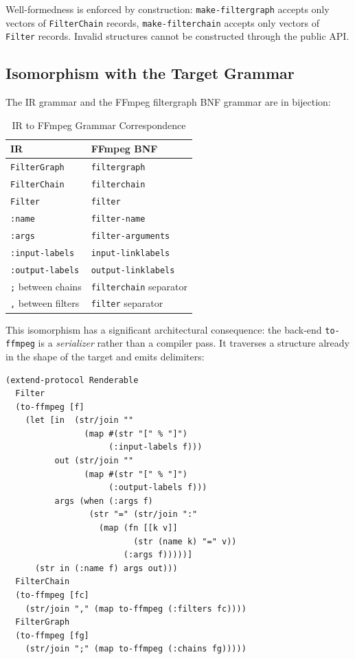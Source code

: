 \documentclass[english,submission]{programming}
\begin{document}
Well-formedness is enforced by construction: \texttt{make-filtergraph} accepts only vectors of \texttt{FilterChain} records, \texttt{make-filterchain} accepts only vectors of \texttt{Filter} records. Invalid structures cannot be constructed through the public API.

\subsection{Isomorphism with the Target Grammar}

The IR grammar and the FFmpeg filtergraph BNF grammar are in bijection:

\begin{table}
\centering
\caption{IR to FFmpeg Grammar Correspondence}
\label{tab:isomorphism}
\begin{tabular}{ll}
\toprule
\textbf{IR} & \textbf{FFmpeg BNF} \\
\midrule
\texttt{FilterGraph} & \texttt{filtergraph} \\
\texttt{FilterChain} & \texttt{filterchain} \\
\texttt{Filter} & \texttt{filter} \\
\texttt{:name} & \texttt{filter-name} \\
\texttt{:args} & \texttt{filter-arguments} \\
\texttt{:input-labels} & \texttt{input-linklabels} \\
\texttt{:output-labels} & \texttt{output-linklabels} \\
\texttt{;} between chains & \texttt{filterchain} separator \\
\texttt{,} between filters & \texttt{filter} separator \\
\bottomrule
\end{tabular}
\end{table}

This isomorphism has a significant architectural consequence: the back-end \texttt{to-ffmpeg} is a \emph{serializer} rather than a compiler pass. It traverses a structure already in the shape of the target and emits delimiters:

\begin{lstlisting}[caption={to-ffmpeg as serializer}]
(extend-protocol Renderable
  Filter
  (to-ffmpeg [f]
    (let [in  (str/join ""
                (map #(str "[" % "]")
                     (:input-labels f)))
          out (str/join ""
                (map #(str "[" % "]")
                     (:output-labels f)))
          args (when (:args f)
                 (str "=" (str/join ":"
                   (map (fn [[k v]]
                          (str (name k) "=" v))
                        (:args f)))))]
      (str in (:name f) args out)))
  FilterChain
  (to-ffmpeg [fc]
    (str/join "," (map to-ffmpeg (:filters fc))))
  FilterGraph
  (to-ffmpeg [fg]
    (str/join ";" (map to-ffmpeg (:chains fg)))))
\end{lstlisting}
\end{document}
